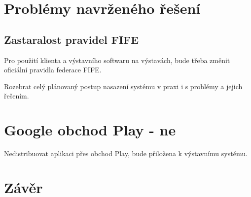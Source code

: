 \documentclass[11pt, oneside]{fithesis2}
\begin{document}
\chapter{Problémy navrženého řešení}
\section{Zastaralost pravidel FIFE}
Pro použití klienta a výstavního softwaru na výstavách, bude třeba změnit oficiální pravidla federace FIFE.

Rozebrat celý plánovaný postup nasazení systému v praxi i s problémy a jejich řešením.

\chapter{Google obchod Play - ne}
Nedistribuovat aplikaci přes obchod Play, bude přiložena k výstavnímu systému.

\chapter{Závěr}
\end{document}
